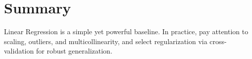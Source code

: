 \documentclass{article}
\begin{document}
\section{Summary}
Linear Regression is a simple yet powerful baseline. In practice, pay attention to scaling, outliers, and multicollinearity, and select regularization via cross-validation for robust generalization.
\end{document}
